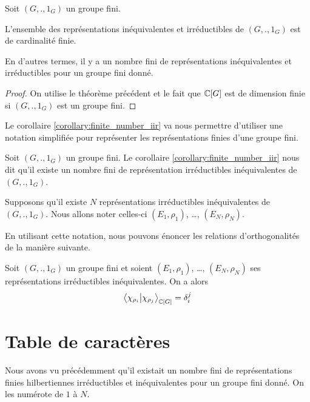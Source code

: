 \begin{corollary}
	\label{corollary:finite_number_iir}
	Soit $(G, ., 1_{G})$ un groupe fini.

	L'ensemble des représentations inéquivalentes et irréductibles de $(G, .,
	1_{G})$ est de cardinalité finie.

	En d'autres termes, il y a un nombre fini de représentations inéquivalentes et irréductibles pour un
	groupe fini donné.
\end{corollary}

\ifdefined\outputproof
\begin{proof}
	On utilise le théorème précédent et le fait que $\mathbb{C}[G]$ est de
	dimension finie si $(G, ., 1_{G})$ est un groupe fini.
\end{proof}
\fi

Le corollaire \ref{corollary:finite_number_iir} va nous permettre d'utiliser une
notation simplifiée pour représenter les représentations finies d'une groupe
fini.

\begin{notation}
	Soit $(G, ., 1_{G})$ un groupe fini.
	Le corollaire \ref{corollary:finite_number_iir} nous dit qu'il existe un
	nombre fini de représentation irréductibles inéquivalentes de $(G, .,
	1_{G})$.

	Supposons qu'il existe $N$ représentations irréductibles
	inéquivalentes de $(G, ., 1_{G})$. Nous allons noter celles-ci $(E_{1},
	\rho_{1})$, \ldots, $(E_{N}, \rho_{N})$.
\end{notation}

En utilisant cette notation, nous pouvons énoncer les relations d'orthogonalités
de la manière suivante.

Soit $(G, ., 1_{G})$ un groupe fini et soient $(E_{1},
	\rho_{1})$, \ldots, $(E_{N},
	\rho_{N})$ ses représentations irréductibles inéquivalentes.
	On a alors
	\begin{equation}
		\bra{\chi_{\rho_{i}}}\ket{\chi_{\rho_{j}}}_{\mathbb{C}[G]} =
		\delta_{i}^{j}
	\end{equation}

\section{Table de caractères}

Nous avons vu précédemment qu'il existait un nombre fini de représentations
finies hilbertiennes irréductibles et inéquivalentes pour un groupe fini donné.
On les numérote de $1$ à $N$.

